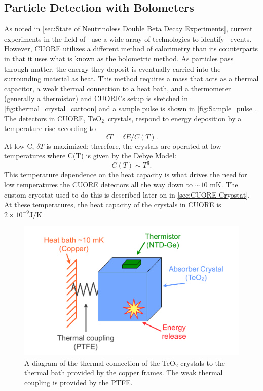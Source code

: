 \subsection{Particle Detection with Bolometers}
As noted in \autoref{sec:State of Neutrinoless Double Beta Decay Experiments}, current experiments in the field of \zeronubb~use a wide array of technologies to identify \zeronubb~events. However, CUORE utilizes a different method of calorimetry than its counterparts in that it uses what is known as the bolometric method. As particles pass through matter, the energy they deposit is eventually carried into the surrounding material as heat. This method requires a mass that acts as a thermal capacitor, a weak thermal connection to a heat bath, and a thermometer (generally a thermistor) and CUORE's setup is sketched in \autoref{fig:thermal_crystal_cartoon} and a sample pulse is shown in \autoref{fig:Sample_pulse}. The detectors in CUORE, $\textrm{TeO}_2$~crystals, respond to energy deposition by a temperature rise according to
\begin{equation}
\delta T = \delta E/C(T).
\end{equation}
At low C, $\delta T$ is maximized; therefore, the crystals are operated at low temperatures where C(T) is given by the Debye Model:
\begin{equation}
C(T)\sim T^3.
\end{equation} 
This temperature dependence on the heat capacity is what drives the need for low temperatures the CUORE detectors all the way down to $\sim10$ mK. The custom cryostat used to do this is described later on in \autoref{sec:CUORE Cryostat}. At these temperatures, the heat capacity of the crystals in CUORE is $2\times 10^{-9} \textrm{J/K}$

\begin{figure}[htbp]
\centering
\includegraphics[width=0.7\linewidth]{Figures/bolosketch-color.pdf}
\caption[A diagram of the thermal connection of the TeO$_2$ crystals to the thermal bath provided by the copper frames.]{A diagram of the thermal connection of the TeO$_2$ crystals to the thermal bath provided by the copper frames. The weak thermal coupling is provided by the PTFE.}
\label{fig:thermal_crystal_cartoon}
\end{figure}

